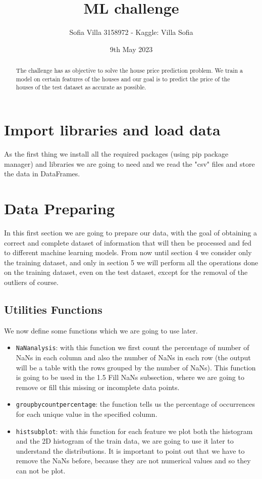 \documentclass[10pt, notitlepage]{article}
\title{ML challenge}
\author{Sofia Villa 3158972 - Kaggle: Villa Sofia }
\date{9th May 2023}
\begin{document}
\maketitle 
\begin{abstract}
\noindent The challenge has as objective to solve the house price prediction problem. We train a model on certain features of the houses and our goal is to predict the price of the houses of the test dataset as accurate as possible. 
\end{abstract}
\tableofcontents
\newpage


 
\color{blue}
\section{Import libraries and load data}
\color{black}

As the first thing we install all the required packages (using pip package manager) and libraries we are going to need and we read the "csv" files and store the data in DataFrames.

\color{blue}
\section{Data Preparing}
\color{black}
In this first section we are going to prepare our data, with the goal of obtaining a correct and complete dataset of information that will then be processed and fed to different machine learning models. From now until section 4 we consider only the training dataset, and only in section 5 we will perform all the operations done on the training dataset, even on the test dataset, except for the removal of the outliers of course.

\color{blue}
\subsection{Utilities Functions}
\color{black}
We now define some functions which we are going to use later.
\begin{itemize}
\item \texttt{NaN\textunderscore analysis}: with this function we first count the percentage of number of NaNs in each column and also the number of NaNs in each row (the output will be a table with the rows grouped by the number of NaNs). This function is going to be used in the 1.5 Fill NaNs subsection, where we are going to remove or fill this missing or incomplete data points. 
\item \texttt{groupby\textunderscore count\textunderscore percentage}: the function tells us the percentage of occurrences for each unique value in the specified column. 
\item \texttt{hist\textunderscore subplot}: with this function for each feature we plot both the histogram and the 2D histogram of the train data, we are going to use it later to understand the distributions. It is important to point out that we have to remove the NaNs before, because they are not numerical values and so they can not be plot. 
\end{itemize}
\end{document}
